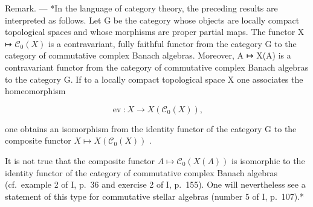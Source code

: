 Remark. --- *In the language of category theory, the preceding results are interpreted as follows. Let G be the category whose objects are locally compact topological spaces and whose morphisms are proper partial maps. The functor X ↦ \(\mathcal{C}_0(X)\) is a contravariant, fully faithful functor from the category G to the category of commutative complex Banach algebras. Moreover, A ↦ X(A) is a contravariant functor from the category of commutative complex Banach algebras to the category G. If to a locally compact topological space X one associates the homeomorphism

\[
\operatorname{ev} \colon X \to X (\mathscr {C} _ {0} (X)),
\]

one obtains an isomorphism from the identity functor of the category G to the composite functor \(X \mapsto X(\mathcal{C}_{0}(X))\) .

It is not true that the composite functor \(A \mapsto \mathcal{C}_{0}(X(A))\) is isomorphic to the identity functor of the category of commutative complex Banach algebras (cf.~example 2 of I, p.~36 and exercise 2 of I, p.~155). One will nevertheless see a statement of this type for commutative stellar algebras (number 5 of I, p.~107).*

